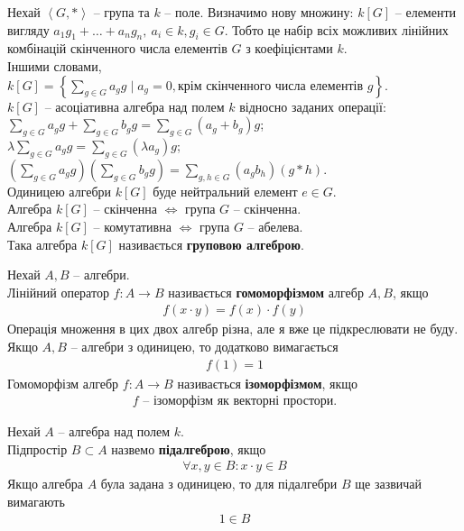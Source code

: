 \documentclass{math_library}
\begin{document}
\begin{example}
Нехай $\left<G,*\right>$ -- група та $k$ -- поле. Визначимо нову множину: $k[G]$ -- елементи вигляду $a_1 g_1 + \dots + a_n g_n,\ a_i \in k, g_i \in G$. Тобто це набір всіх можливих лінійних комбінацій скінченного числа елементів $G$ з коефіцієнтами $k$.\\
Іншими словами, $k[G] = \displaystyle\left\{ \sum_{g \in G} a_g g \mid a_g = 0, \text{крім скінченного числа елементів }g \right\}$.\\
$k[G]$ -- асоціативна алгебра над полем $k$ відносно заданих операції:\\
$\displaystyle\sum_{g \in G} a_g g + \sum_{g \in G} b_g g = \sum_{g \in G} (a_g + b_g) g$;\\
$\displaystyle \lambda \sum_{g \in G} a_g g = \sum_{g \in G} (\lambda a_g) g$;\\
$\displaystyle\left( \sum_{g \in G} a_g g \right) \left( \sum_{g \in G} b_g g \right) = \sum_{g,h \in G} (a_g b_h) (g*h)$.\\
Одиницею алгебри $k[G]$ буде нейтральний елемент $e \in G$.\\
Алгебра $k[G]$ -- скінченна $\iff$ група $G$ -- скінченна.\\
Алгебра $k[G]$ -- комутативна $\iff$ група $G$ -- абелева.
\bigskip \\
Така алгебра $k[G]$ називається \textbf{груповою алгеброю}.
\end{example}

\begin{definition}
Нехай $A,B$ -- алгебри.\\
Лінійний оператор $f \colon A \to B$ називається \textbf{гомоморфізмом} алгебр $A,B$, якщо
\begin{align*}
f(x \cdot y) = f(x) \cdot f(y)
\end{align*}
Операція множення в цих двох алгебр різна, але я вже це підкреслювати не буду.\\
Якщо $A,B$ -- алгебри з одиницею, то додатково вимагається
\begin{align*}
f(1) = 1
\end{align*}
Гомоморфізм алгебр $f \colon A \to B$ називається \textbf{ізоморфізмом}, якщо
\begin{align*}
\text{$f$ -- ізоморфізм як векторні простори.}
\end{align*}
\end{definition}

\begin{definition}
Нехай $A$ -- алгебра над полем $k$.\\
Підпростір $B \subset A$ назвемо \textbf{підалгеброю}, якщо
\begin{align*}
\forall x,y \in B: x \cdot y \in B
\end{align*}
Якщо алгебра $A$ була задана з одиницею, то для підалгебри $B$ ще зазвичай вимагають
\begin{align*}
1 \in B
\end{align*}
\end{definition}
\end{document}
